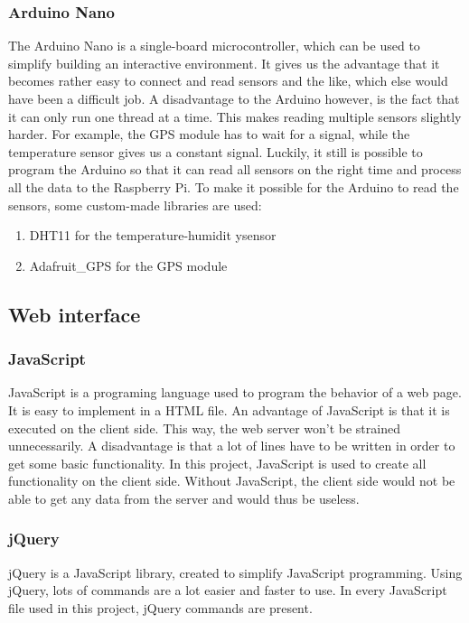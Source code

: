 \subsubsection{Arduino Nano}
The Arduino Nano is a single-board microcontroller, which can be used to simplify building an interactive environment. It gives us the advantage that it becomes rather easy to connect and read sensors and the like, which else would have been a difficult job. A disadvantage to the Arduino however, is the fact that it can only run one thread at a time. This makes reading multiple sensors slightly harder. For example, the GPS module has to wait for a signal, while the temperature sensor gives us a constant signal. Luckily, it still is possible to program the Arduino so that it can read all sensors on the right time and process all the data to the Raspberry Pi.
To make it possible for the Arduino to read the sensors, some custom-made libraries are used:
\begin{enumerate}
 \item DHT11 for the temperature-humidit ysensor
 \item Adafruit\_GPS for the GPS module
\end{enumerate}

\subsection{Web interface}
\subsubsection{JavaScript}
JavaScript is a programing language used to program the behavior of a web page.
It is easy to implement in a HTML file. An advantage of JavaScript is that it is
executed on the client side. This way, the web server won't be strained unnecessarily.
A disadvantage is that a lot of lines have to be written in order to get some basic
functionality. In this project, JavaScript is used to create all functionality on the
client side. Without JavaScript, the client side would not be able to get any data from
the server and would thus be useless. 

\subsubsection{jQuery}
jQuery is a JavaScript library, created to simplify JavaScript programming. Using jQuery,
lots of commands are a lot easier and faster to use. In every JavaScript file used in this
project, jQuery commands are present.

